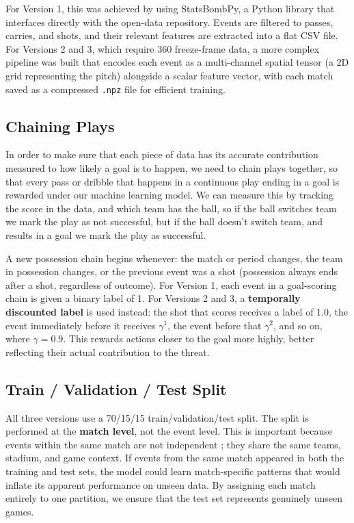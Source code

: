 \documentclass{article}
\begin{document}
For Version 1, this was achieved by using StatsBombPy, a Python library that interfaces directly with the open-data repository. Events are filtered to passes, carries, and shots, and their relevant features are extracted into a flat CSV file. For Versions 2 and 3, which require 360 freeze-frame data, a more complex pipeline was built that encodes each event as a multi-channel spatial tensor (a 2D grid representing the pitch) alongside a scalar feature vector, with each match saved as a compressed \texttt{.npz} file for efficient training.

\subsection{Chaining Plays}

In order to make sure that each piece of data has its accurate contribution measured to how likely a goal is to happen, we need to chain plays together, so that every pass or dribble that happens in a continuous play ending in a goal is rewarded under our machine learning model. We can measure this by tracking the score in the data, and which team has the ball, so if the ball switches team we mark the play as not successful, but if the ball doesn't switch team, and results in a goal we mark the play as successful.

A new possession chain begins whenever: the match or period changes, the team in possession changes, or the previous event was a shot (possession always ends after a shot, regardless of outcome). For Version 1, each event in a goal-scoring chain is given a binary label of 1. For Versions 2 and 3, a \textbf{temporally discounted label} is used instead: the shot that scores receives a label of 1.0, the event immediately before it receives $\gamma^1$, the event before that $\gamma^2$, and so on, where $\gamma = 0.9$. This rewards actions closer to the goal more highly, better reflecting their actual contribution to the threat.

\subsection{Train / Validation / Test Split}

All three versions use a 70/15/15 train/validation/test split. The split is performed at the \textbf{match level}, not the event level. This is important because events within the same match are not independent ; they share the same teams, stadium, and game context. If events from the same match appeared in both the training and test sets, the model could learn match-specific patterns that would inflate its apparent performance on unseen data. By assigning each match entirely to one partition, we ensure that the test set represents genuinely unseen games.
\end{document}

